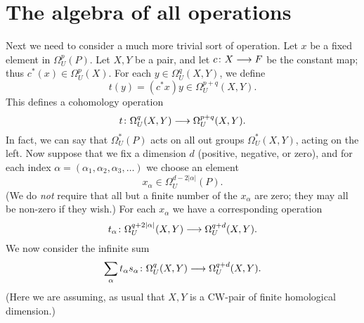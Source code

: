 \documentclass[../main]{subfiles}
\begin{document}
\label{sec:p1c6}


\chapter{The algebra of all operations}

Next we need to consider a much more trivial sort of operation. Let $x$ be a fixed element in $\Omega_U^p(P)$. Let $X,Y$ be a pair, and let $c \colon X \longrightarrow F$ be the constant map; thus $c^*(x) \in \Omega_U^p(X)$. For each $y \in \Omega_U^q(X,Y)$, we define 
\[t(y) = (c^* x)y \in \Omega_U^{p+q}(X,Y).\]
This defines a cohomology operation
\[t\colon \Omega_U^q(X,Y) \longrightarrow \Omega_U^{p+q}(X,Y).\]
In fact, we can say that $\Omega_U^*(P)$ acts on all out groups $\Omega_U^*(X,Y)$, acting on the left. 
Now suppose that we fix a dimension $d$ (positive, negative, or zero), and for each index $\alpha = (\alpha_1, \alpha_2, \alpha_3, \dots)$ we choose an element 
\[x_\alpha \in \Omega_U^{d - 2|\alpha|}(P).\]
(We do \emph{not} require that all but a finite number of the $x_\alpha$ are zero; they may all be non-zero if they wish.) For each $x_\alpha$ we have a corresponding operation
\[t_\alpha \colon \Omega_U^{q + 2|\alpha|}(X,Y) \longrightarrow \Omega_U^{q+d}(X,Y).\]
We now consider the infinite sum 
\[\sum_\alpha t_\alpha s_\alpha \colon \Omega^q_U(X,Y) \longrightarrow \Omega_U^{q+d}(X,Y).\]
(Here we are assuming, as usual that $X,Y$ is a CW-pair of finite homological dimension.)
\end{document}
